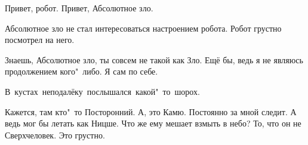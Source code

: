 \begin{dialog}
\X Привет, робот.
\R Привет, Абсолютное зло.
\end{dialog}

\begin{monolog}
Абсолютное зло не стал интересоваться настроением робота. Робот грустно посмотрел на него.
\end{monolog}

\begin{dialog}
\R Знаешь, Абсолютное зло, ты совсем не такой как Зло.
\X Ещё бы, ведь я не являюсь продолжением кого"~либо. Я сам по себе.
\end{dialog}

\begin{monolog}
\mbox{В кустах неподалёку послышался какой"~то шорох.}
\end{monolog}

\begin{dialog}
\R Кажется, там кто"~то Посторонний.
\X А, это Камю. Постоянно за мной следит. А ведь мог бы летать как Ницше.
\R Что же ему мешает взмыть в небо?
\X То, что он не Сверхчеловек.
\R Это грустно.
\end{dialog}